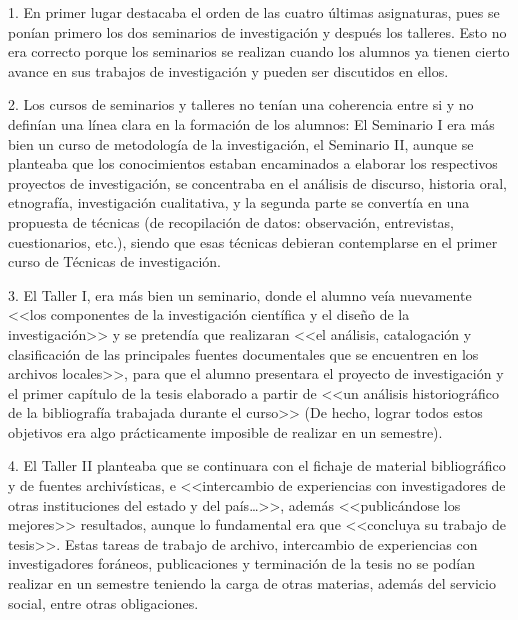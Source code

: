 \begin{Obs}
\item[1.] En primer lugar destacaba el orden de las cuatro últimas 
asignaturas, pues se ponían primero los dos seminarios de investigación 
y después los talleres. Esto no era correcto porque los seminarios se 
realizan cuando los alumnos ya tienen cierto avance en sus trabajos de 
investigación y pueden ser discutidos en ellos. 

\item[2.] Los cursos de seminarios y talleres no tenían una coherencia 
entre si y no definían una línea clara en la formación de los alumnos: 
El Seminario I era más bien un curso de metodología de la 
investigación, el Seminario II, aunque se planteaba que los 
conocimientos estaban encaminados a elaborar los respectivos proyectos 
de investigación, se concentraba en el análisis de discurso, historia 
oral, etnografía, investigación cualitativa, y la segunda parte se 
convertía en una  propuesta de técnicas (de recopilación de datos: 
observación, entrevistas, cuestionarios, etc.), siendo que esas 
técnicas debieran contemplarse en el primer curso de Técnicas de 
investigación.

\item[3.] El Taller I, era más bien un seminario, donde el alumno veía 
nuevamente <<los componentes de la investigación científica y el diseño 
de la investigación>> y se pretendía que realizaran <<el análisis, 
catalogación y clasificación de las principales fuentes documentales 
que se encuentren en los archivos locales>>, para que el alumno 
presentara el proyecto de investigación y el primer capítulo de la 
tesis elaborado a partir de <<un análisis historiográfico de la 
bibliografía trabajada durante el curso>> (De hecho, lograr todos estos 
objetivos era algo prácticamente imposible de realizar en un semestre).
\enlargethispage{-1\baselineskip}

\item[4.] El Taller II planteaba que se continuara con el fichaje de 
material bibliográfico y de fuentes archivísticas, e <<intercambio de 
experiencias con investigadores de otras instituciones del estado y del 
país\ldots >>, además <<publicándose los mejores>> resultados, aunque lo 
fundamental era que <<concluya su trabajo de tesis>>. Estas tareas de 
trabajo de archivo, intercambio de experiencias con investigadores 
foráneos, publicaciones y terminación de la tesis no se podían realizar 
en un semestre teniendo la carga de otras materias, además del servicio 
social, entre otras obligaciones. 
\end{Obs}

